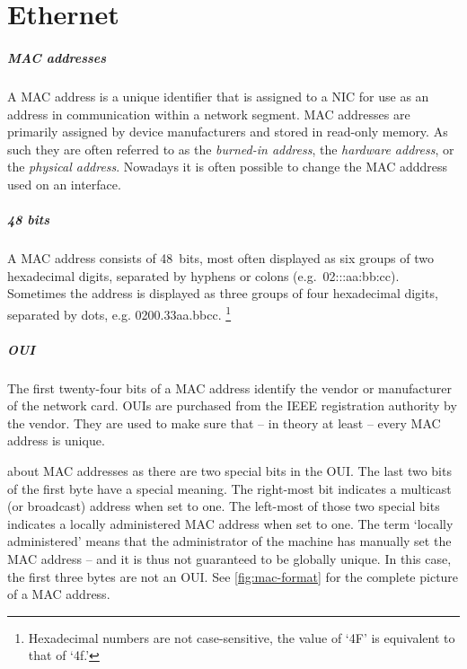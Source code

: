 \chapter{Ethernet}
\label{chap:ethernet}

\paragraph{\acs{MAC} addresses}
A \ac{MAC} address is a unique identifier that is assigned to a \ac{NIC} for use as an address in communication within a network segment.
\ac{MAC} addresses are primarily assigned by device manufacturers and stored in read-only memory.
As such they are often referred to as the \emph{burned-in address}, the \emph{hardware address}, or the \emph{physical address}.
Nowadays it is often possible to change the \acs{MAC} adddress used on an interface.

\paragraph{48 bits}
A \ac{MAC} address consists of 48~bits, most often displayed as six groups of two hexadecimal digits, separated by hyphens or colons (e.g.~02:::\-aa:\-bb:\-cc).
Sometimes the address is displayed as three groups of four hexadecimal digits, separated by dots, e.g. 0200.33aa.bbcc.%
   \footnote{Hexadecimal numbers are not case-sensitive, the value of `4F' is equivalent to that of `4f.'}

\paragraph{\acl{OUI}}
The first twenty-four bits of a \ac{MAC} address identify the vendor or manufacturer of the network card.
\Acp{OUI} are purchased from the \acs{IEEE} registration authority by the vendor.
They are used to make sure that -- in theory at least -- every \acs{MAC} address is unique.

 about \acs{MAC} addresses as there are two special bits in the \acs{OUI}.
The last two bits of the first byte have a special meaning.
The right-most bit indicates a multicast (or broadcast) address when set to one.
The left-most of those two special bits indicates a locally administered \acs{MAC} address when set to one.
The term `locally administered' means that the administrator of the machine has manually set the \acs{MAC} address -- and it is thus not guaranteed to be globally unique.
In this case, the first three bytes are not an \acl{OUI}.
See \cref{fig:mac-format} for the complete picture of a \acs{MAC} address.


